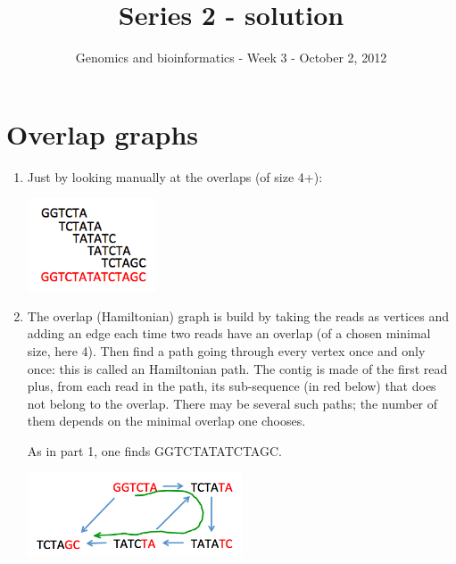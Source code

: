 \documentclass[a4paper,11pt]{article}
\title{Series 2 - solution}
\date{}
\author{Genomics and bioinformatics - Week 3 - October 2, 2012}
\begin{document}
\maketitle

\section{Overlap graphs}

\begin{enumerate}
\item Just by looking manually at the overlaps (of size 4+):

\begin{center}
\includegraphics[width=0.3\textwidth]{byhand.png}\\
\end{center}

\item The overlap (Hamiltonian) graph is build by taking the reads as vertices and adding an edge each time two reads have an overlap (of a chosen minimal size, here 4). Then find a path going through every vertex once and only once: this is called an Hamiltonian path. The contig is made of the first read plus, from each read in the path, its sub-sequence (in red below) that does not belong to the overlap. There may be several such paths; the number of them depends on the minimal overlap one chooses.

As in part 1, one finds GGTCTATATCTAGC.

\begin{center}
\includegraphics[width=0.5\textwidth]{hamiltonian.png}\\
\end{center}


\end{enumerate}
\end{document}
